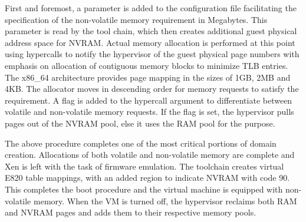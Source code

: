 First and foremost, a parameter is added to the configuration file facilitating the specification of the non-volatile memory requirement in Megabytes. This parameter is read by the tool chain, which then creates additional guest physical address space for NVRAM. Actual memory allocation is performed at this point using hypercalls to notify the hypervisor of the guest physical page numbers with emphasis on allocation of contiguous memory blocks to minimize TLB entries. The x86\_64 architecture provides page mapping in the sizes of 1GB, 2MB and 4KB. The allocator moves in descending order for memory requests to satisfy the requirement. A flag is added to the hypercall argument to differentiate between volatile and non-volatile memory requests. If the flag is set, the hypervisor pulls pages out of the NVRAM pool, else it uses the RAM pool for the purpose.

The above procedure completes one of the most critical portions of domain creation. Allocations of both volatile and non-volatile memory are complete and Xen is left with the task of firmware emulation. The toolchain creates virtual E820 table mappings, with an added region to indicate NVRAM with code 90. This completes the boot procedure and the virtual machine is equipped with non-volatile memory. When the VM is turned off, the hypervisor reclaims both RAM and NVRAM pages and adds them to their respective memory pools. 
